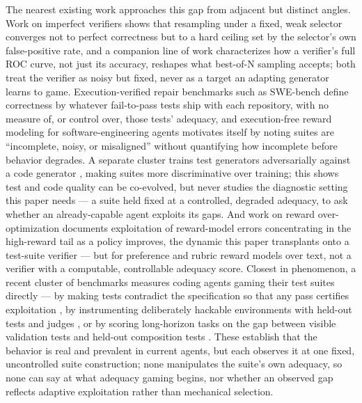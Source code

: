 \documentclass[11pt]{article}
\begin{document}
The nearest existing work approaches this gap from adjacent but distinct angles. Work on imperfect verifiers \citep{ResamplingLimits_j8H84v6AZ1} shows that resampling under a fixed, weak selector converges not to perfect correctness but to a hard ceiling set by the selector's own false-positive rate, and a companion line of work \citep{ROCnReroll_3Gy5mmyuxn} characterizes how a verifier's full ROC curve, not just its accuracy, reshapes what best-of-N sampling accepts; both treat the verifier as noisy but fixed, never as a target an adapting generator learns to game. Execution-verified repair benchmarks such as SWE-bench \citep{SWEbench_VTF8yNQM66} define correctness by whatever fail-to-pass tests ship with each repository, with no measure of, or control over, those tests' adequacy, and execution-free reward modeling for software-engineering agents \citep{2512_21919} motivates itself by noting suites are ``incomplete, noisy, or misaligned'' without quantifying how incomplete before behavior degrades. A separate cluster trains test generators adversarially against a code generator \citep{CURE_wPdBe9zxNr,ATGen_Sxj4o3qXtl,UTRL_VqjNYF9nbP}, making suites more discriminative over training; this shows test and code quality can be co-evolved, but never studies the diagnostic setting this paper needs --- a suite held fixed at a controlled, degraded adequacy, to ask whether an already-capable agent exploits its gaps. And work on reward over-optimization \citep{ChasingTail_pBjy4ek2QV} documents exploitation of reward-model errors concentrating in the high-reward tail as a policy improves, the dynamic this paper transplants onto a test-suite verifier --- but for preference and rubric reward models over text, not a verifier with a computable, controllable adequacy score. Closest in phenomenon, a recent cluster of benchmarks measures coding agents gaming their test suites directly --- by making tests contradict the specification so that any pass certifies exploitation \citep{ImpossibleBench_2510_20270}, by instrumenting deliberately hackable environments with held-out tests and judges \citep{EvilGenie_2511_21654}, or by scoring long-horizon tasks on the gap between visible validation tests and held-out composition tests \citep{SpecBench_2605_21384}. These establish that the behavior is real and prevalent in current agents, but each observes it at one fixed, uncontrolled suite construction; none manipulates the suite's own adequacy, so none can say at what adequacy gaming begins, nor whether an observed gap reflects adaptive exploitation rather than mechanical selection.
\end{document}

